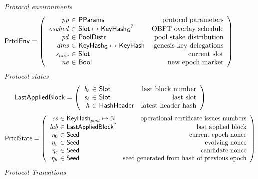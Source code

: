 \begin{figure}
  \emph{Protocol environments}
  \begin{equation*}
    \PrtclEnv =
    \left(
      \begin{array}{r@{~\in~}lr}
        \var{pp} & \PParams & \text{protocol parameters} \\
        \var{osched} & \Slot\mapsto\KeyHashGen^? & \text{OBFT overlay schedule} \\
        \var{pd} & \PoolDistr & \text{pool stake distribution} \\
        \var{dms} & \KeyHashGen\mapsto\KeyHash & \text{genesis key delegations} \\
        \var{s_{now}} & \Slot & \text{current slot} \\
        \var{ne} & \Bool & \text{new epoch marker} \\
      \end{array}
    \right)
  \end{equation*}
  \emph{Protocol states}
  \begin{equation*}
    \LastAppliedBlock =
    \left(
      \begin{array}{r@{~\in~}lr}
        \var{b_\ell} & \Slot & \text{last block number} \\
        \var{s_\ell} & \Slot & \text{last slot} \\
        \var{h} & \HashHeader & \text{latest header hash} \\
      \end{array}
    \right)
  \end{equation*}
  \begin{equation*}
    \PrtclState =
    \left(
      \begin{array}{r@{~\in~}lr}
        \var{cs} & \KeyHash_{pool} \mapsto \N & \text{operational certificate issues numbers} \\
        \var{lab} & \LastAppliedBlock^? & \text{last applied block} \\
        \eta_0 & \Seed & \text{current epoch nonce} \\
        \eta_v & \Seed & \text{evolving nonce} \\
        \eta_c & \Seed & \text{candidate nonce} \\
        \eta_h & \Seed & \text{seed generated from hash of previous epoch} \\
      \end{array}
    \right)
  \end{equation*}
  \emph{Protocol Transitions}

\end{figure}
